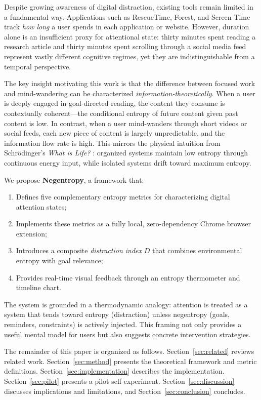 \documentclass[10pt,letterpaper]{article}
\begin{document}
Despite growing awareness of digital distraction, existing tools remain limited in a fundamental way. Applications such as RescueTime, Forest, and Screen Time track \emph{how long} a user spends in each application or website. However, duration alone is an insufficient proxy for attentional state: thirty minutes spent reading a research article and thirty minutes spent scrolling through a social media feed represent vastly different cognitive regimes, yet they are indistinguishable from a temporal perspective.

The key insight motivating this work is that the difference between focused work and mind-wandering can be characterized \emph{information-theoretically}. When a user is deeply engaged in goal-directed reading, the content they consume is contextually coherent---the conditional entropy of future content given past content is low. In contrast, when a user mind-wanders through short videos or social feeds, each new piece of content is largely unpredictable, and the information flow rate is high. This mirrors the physical intuition from Schr\"odinger's \textit{What is Life?} \cite{schrodinger1944life}: organized systems maintain low entropy through continuous energy input, while isolated systems drift toward maximum entropy.

We propose \textbf{Negentropy}, a framework that:
\begin{enumerate}[noitemsep]
    \item Defines five complementary entropy metrics for characterizing digital attention states;
    \item Implements these metrics as a fully local, zero-dependency Chrome browser extension;
    \item Introduces a composite \emph{distraction index} $D$ that combines environmental entropy with goal relevance;
    \item Provides real-time visual feedback through an entropy thermometer and timeline chart.
\end{enumerate}

The system is grounded in a thermodynamic analogy: attention is treated as a system that tends toward entropy (distraction) unless negentropy (goals, reminders, constraints) is actively injected. This framing not only provides a useful mental model for users but also suggests concrete intervention strategies.

The remainder of this paper is organized as follows. Section~\ref{sec:related} reviews related work. Section~\ref{sec:method} presents the theoretical framework and metric definitions. Section~\ref{sec:implementation} describes the implementation. Section~\ref{sec:pilot} presents a pilot self-experiment. Section~\ref{sec:discussion} discusses implications and limitations, and Section~\ref{sec:conclusion} concludes.
\end{document}

